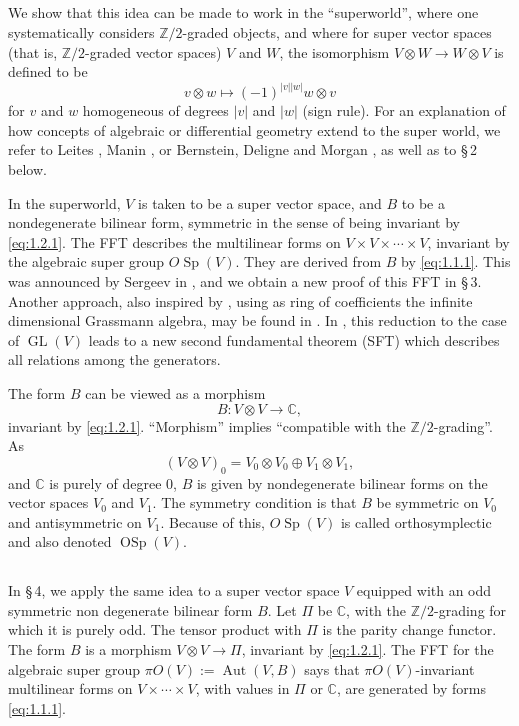 \documentclass[11pt,a4paper]{article}
\theoremstyle{plain}
\theoremstyle{definition}
\DeclareMathOperator{\Aut}{Aut}
\DeclareMathOperator{\GL}{GL}
\DeclareMathOperator{\OSp}{OSp}
\DeclareMathOperator{\Sp}{Sp}
\newcommand{\Z}{\mathbb{Z}}
\newcommand{\C}{\mathbb{C}}
\begin{document}
\subsection{}
We show that this idea can be made to work in the ``superworld'', where one systematically considers $\Z/2$-graded objects, and where for super vector spaces (that is, $\Z/2$-graded vector spaces) $V$ and $W$, the isomorphism $V \otimes W \to W \otimes V$ is defined to be
\begin{equation}\label{eq:1.2.1}
v \otimes w \mapsto (-1)^{|v||w|} w \otimes v
\end{equation}
for $v$ and $w$ homogeneous of degrees $|v|$ and $|w|$ (sign rule). For an explanation of how concepts of algebraic or differential geometry extend to the super world, we refer to Leites \cite{Lei90}, Manin \cite{Man88}, or Bernstein, Deligne and Morgan \cite{DM99}, as well as to \S\,2 below.

In the superworld, $V$ is taken to be a super vector space, and $B$ to be a nondegenerate bilinear form, symmetric in the sense of being invariant by \eqref{eq:1.2.1}. The FFT describes the multilinear forms on $V \times V \times \cdots \times V$, invariant by the algebraic super group $O\!\Sp(V)$. They are derived from $B$ by \eqref{eq:1.1.1}. This was announced by Sergeev in \cite{Ser92}, and we obtain a new proof of this FFT in \S\,3. Another approach, also inspired by \cite{ABP73}, using as ring of coefficients the infinite dimensional Grassmann algebra, may be found in \cite{LZ14a}. In \cite{LZ14b}, this reduction to the case of $\GL(V)$ leads to a new second fundamental theorem (SFT) which describes all relations among the generators.

The form $B$ can be viewed as a morphism
\[
B: V \otimes V \to \C,
\]
invariant by \eqref{eq:1.2.1}. ``Morphism'' implies ``compatible with the $\Z/2$-grading''. As
\[
(V \otimes V)_0 = V_0 \otimes V_0 \oplus V_1 \otimes V_1,
\]
and $\C$ is purely of degree $0$, $B$ is given by nondegenerate bilinear forms on the vector spaces $V_0$ and $V_1$. The symmetry condition is that $B$ be symmetric on $V_0$ and antisymmetric on $V_1$. Because of this, $O\!\Sp(V)$ is called orthosymplectic and also denoted $\OSp(V)$.

\subsection{}
In \S\,4, we apply the same idea to a super vector space $V$ equipped with an odd symmetric non degenerate bilinear form $B$. Let $\Pi$ be $\C$, with the $\Z/2$-grading for which it is purely odd. The tensor product with $\Pi$ is the parity change functor. The form $B$ is a morphism $V \otimes V \to \Pi$, invariant by \eqref{eq:1.2.1}. The FFT for the algebraic super group $\pi O(V) := \Aut(V,B)$ says that $\pi O(V)$-invariant multilinear forms on $V \times \cdots \times V$, with values in $\Pi$ or $\C$, are generated by forms \eqref{eq:1.1.1}.
\end{document}
